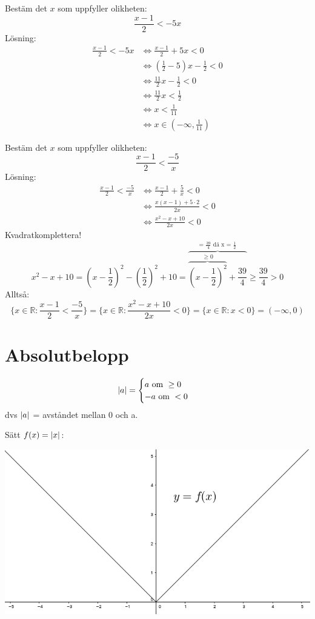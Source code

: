 \begin{Ex}
    Bestäm det $x$ som uppfyller olikheten:
    \[
    \frac{x-1}{2} < -5x
    \]
    Lösning:
    \begin{align*}
        \frac{x-1}{2} < -5x &\Leftrightarrow \frac{x-1}{2} + 5x < 0 \\
        &\Leftrightarrow (\frac{1}{2} -5)x - \frac{1}{2} < 0 \\
        &\Leftrightarrow \frac{11}{2}x - \frac{1}{2} < 0 \\
        &\Leftrightarrow \frac{11}{2}x < \frac{1}{2} \\
        &\Leftrightarrow x < \frac{1}{11} \\
        &\Leftrightarrow x \in (-\infty, \frac{1}{11})
    \end{align*}
\end{Ex}
\begin{Ex}
    Bestäm det $x$ som uppfyller olikheten:
    \[
    \frac{x-1}{2} < \frac{-5}{x}
    \]
    Lösning:
    \begin{align*}
        \frac{x-1}{2} < \frac{-5}{x} &\Leftrightarrow \frac{x-1}{2} + \frac{5}{x} < 0 \\
        &\Leftrightarrow \frac{x(x-1) + 5 \cdot 2}{2x} < 0 \\
        &\Leftrightarrow \frac{x^2 - x + 10}{2x} < 0
    \end{align*}
    Kvadratkomplettera!
    \[
    x^2 - x + 10 = (x - \frac{1}{2})^2 - (\frac{1}{2})^2 + 10 = \overbrace{\overbrace{(x - \frac{1}{2})^2}^{\ge 0} + \frac{39}{4}}^\text{= $\frac{39}{4}$ då x = $\frac{1}{2}$} \ge \frac{39}{4} > 0
    \]
    Alltså:
    \[
    \{x \in \mathbb{R}: \frac{x-1}{2} < \frac{-5}{x}\} = \{x \in \mathbb{R}: \frac{x^2 - x + 10}{2x} < 0 \} = \{x \in \mathbb{R}: x < 0\} = (-\infty, 0)
    \]
\end{Ex}
\section{Absolutbelopp} %
\label{sec:absolutbelopp}
\begin{Def}
    \[
    \lvert a\rvert =
    \begin{cases}
        a \mbox{ om } \ge 0\\
        -a \mbox{ om } < 0
    \end{cases}
    \]
    dvs $\lvert a\rvert$ = avståndet mellan 0 och a.
\end{Def}
Sätt $f(x) = \lvert x\rvert$:
\begin{center}
    \includegraphics[scale=0.5]{graf.png}
\end{center}
